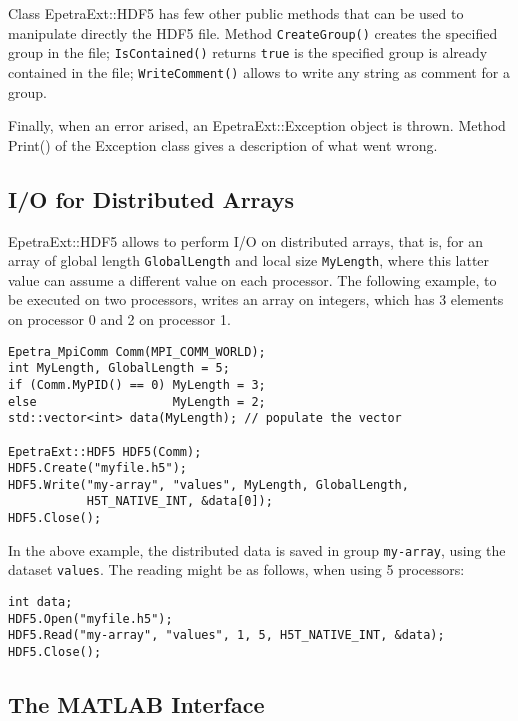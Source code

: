 \documentclass[11pt,relax]{SANDreport}
\begin{document}
Class EpetraExt::HDF5 has few other public methods that can be used to
manipulate directly the HDF5 file. Method
{\tt CreateGroup()} creates the specified group in the file;
{\tt IsContained()} returns {\tt true} is the specified group is already 
contained in the file;
{\tt WriteComment()} allows to write any string as comment for a group.

Finally, when an error arised, an EpetraExt::Exception object is thrown.
Method Print() of the Exception class gives a description of what went wrong.

\subsection{I/O for Distributed Arrays}
\label{sec:hdf5:arrays}

EpetraExt::HDF5 allows to perform I/O on distributed arrays, that is, for an
array of global length {\tt GlobalLength} and local size {\tt MyLength}, where
this latter value can assume a different value on each processor. The
following example, to be executed on two processors, writes an array on
integers, which has 3 elements on processor 0 and 2 on processor 1.
\begin{verbatim}
Epetra_MpiComm Comm(MPI_COMM_WORLD);
int MyLength, GlobalLength = 5;
if (Comm.MyPID() == 0) MyLength = 3;
else                   MyLength = 2;
std::vector<int> data(MyLength); // populate the vector

EpetraExt::HDF5 HDF5(Comm);
HDF5.Create("myfile.h5");
HDF5.Write("my-array", "values", MyLength, GlobalLength,
           H5T_NATIVE_INT, &data[0]);
HDF5.Close();
\end{verbatim}
In the above example, the distributed data is saved in group {\tt my-array},
   using the dataset {\tt values}. The reading might be as follows, when using
   5 processors:
\begin{verbatim}
int data;
HDF5.Open("myfile.h5");
HDF5.Read("my-array", "values", 1, 5, H5T_NATIVE_INT, &data);
HDF5.Close();
\end{verbatim}

\subsection{The MATLAB Interface}
\label{sec:hdf5:matlab}
\end{document}
